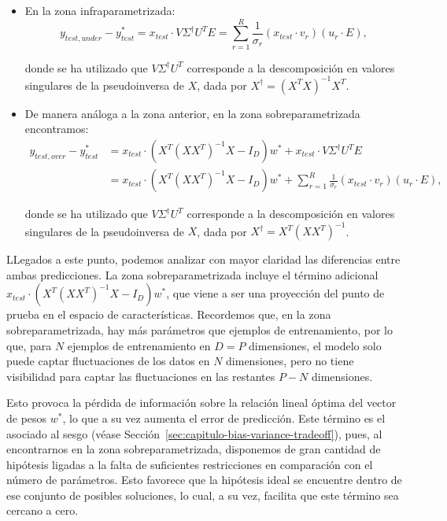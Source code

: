 \begin{itemize}
    \item En la zona infraparametrizada:
        \[
            y_{test, under} - y_{test}^{*} = x_{test} \cdot V \Sigma^{\dagger} U^{T} E = \sum_{r=1}^{R}\frac{1}{\sigma_r}(x_{test} \cdot v_r)(u_r \cdot E),
        \]

        donde se ha utilizado que $V \Sigma^{\dagger} U^{T}$ corresponde a la descomposición en valores singulares de la pseudoinversa de $X$, dada por $X^{\dagger} = {(X^T X)}^{-1} X^T$.

    \item De manera análoga a la zona anterior, en la zona sobreparametrizada encontramos: 
        \[
            \begin{aligned}
                y_{test, over} - y_{test}^{*} &= x_{test} \cdot (X^{T}{(XX^{T})}^{-1}X - I_{D}) w^{*} 
                + x_{test} \cdot V \Sigma^{\dagger} U^{T} E \\
                &= x_{test} \cdot (X^{T}{(XX^{T})}^{-1}X - I_{D}) w^{*} 
                + \sum_{r=1}^{R}\frac{1}{\sigma_r}(x_{test} \cdot v_r)(u_r \cdot E),
            \end{aligned}
        \]

        donde se ha utilizado que $V \Sigma^{\dagger} U^{T}$ corresponde a la descomposición en valores singulares de la pseudoinversa de $X$, dada por $X^{\dagger} = X^{T}{(XX^{T})}^{-1}$.
\end{itemize}

LLegados a este punto, podemos analizar con mayor claridad las diferencias entre ambas predicciones. La zona sobreparametrizada incluye el término adicional $x_{test} \cdot (X^{T}{(XX^{T})}^{-1}X - I_{D}) w^{*}$, que viene a ser una proyección del punto de prueba en el espacio de características. Recordemos que, en la zona sobreparametrizada, hay más parámetros que ejemplos de entrenamiento, por lo que, para $N$ ejemplos de entrenamiento en $D = P$ dimensiones, el modelo solo puede captar fluctuaciones de los datos en $N$ dimensiones, pero no tiene visibilidad para captar las fluctuaciones en las restantes $P - N$ dimensiones.

Esto provoca la pérdida de información sobre la relación lineal óptima del vector de pesos $w^{*}$, lo que a su vez aumenta el error de predicción. Este término es el asociado al sesgo (véase Sección~\ref{sec:capitulo-bias-variance-tradeoff}), pues, al encontrarnos en la zona sobreparametrizada, disponemos de gran cantidad de hipótesis ligadas a la falta de suficientes restricciones en comparación con el número de parámetros. Esto favorece que la hipótesis ideal se encuentre dentro de ese conjunto de posibles soluciones, lo cual, a su vez, facilita que este término sea cercano a cero.


